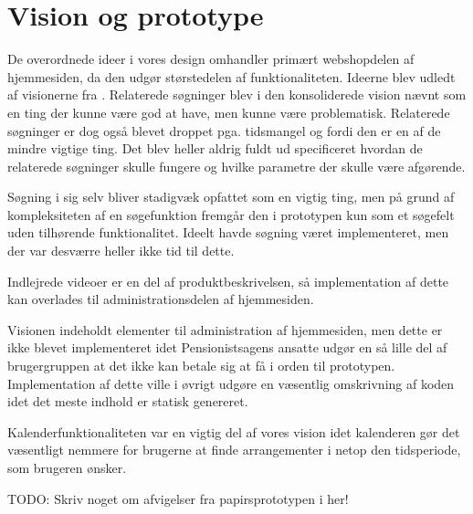 \section{Vision og prototype}

De overordnede ideer i vores design omhandler primært webshopdelen af
hjemmesiden, da den udgør størstedelen af funktionaliteten. Ideerne blev
udledt af visionerne fra \cite{opgave3}. Relaterede søgninger blev i den
konsoliderede vision nævnt som en ting der kunne være god at have, men
kunne være problematisk. Relaterede søgninger er dog også blevet droppet
pga. tidsmangel og fordi den er en af de mindre vigtige ting. Det blev heller
aldrig fuldt ud specificeret hvordan de relaterede søgninger skulle fungere
og hvilke parametre der skulle være afgørende.

Søgning i sig selv bliver stadigvæk opfattet som en vigtig ting, men på
grund af kompleksiteten af en søgefunktion fremgår den i prototypen kun som
et søgefelt uden tilhørende funktionalitet. Ideelt havde søgning været
implementeret, men der var desværre heller ikke tid til dette.

Indlejrede videoer er en del af produktbeskrivelsen, så implementation af
dette kan overlades til administrationsdelen af hjemmesiden.

Visionen indeholdt elementer til administration af hjemmesiden, men dette er
ikke blevet implementeret idet Pensionistsagens ansatte udgør en så lille
del af brugergruppen at det ikke kan betale sig at få i orden til prototypen.
Implementation af dette ville i øvrigt udgøre en væsentlig omskrivning af
koden idet det meste indhold er statisk genereret.

Kalenderfunktionaliteten var en vigtig del af vores vision idet kalenderen
gør det væsentligt nemmere for brugerne at finde arrangementer i netop den
tidsperiode, som brugeren ønsker.

TODO: Skriv noget om afvigelser fra papirsprototypen i \cite{opgave4} her!
